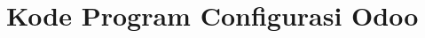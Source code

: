 \chapter{Kode Program Configurasi Odoo}
\label{lamp:B}

\def\scl{1}
\def\leg{} 
\def\std{none}
\def\ymin{}
\def\ymax{}




